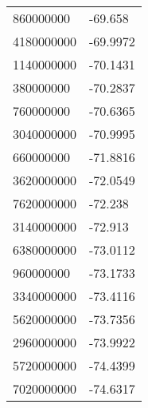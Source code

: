\begin{tabular}{ll}
860000000 & -69.658 \\ 
4180000000 & -69.9972 \\ 
1140000000 & -70.1431 \\ 
380000000 & -70.2837 \\ 
760000000 & -70.6365 \\ 
3040000000 & -70.9995 \\ 
660000000 & -71.8816 \\ 
3620000000 & -72.0549 \\ 
7620000000 & -72.238 \\ 
3140000000 & -72.913 \\ 
6380000000 & -73.0112 \\ 
960000000 & -73.1733 \\ 
3340000000 & -73.4116 \\ 
5620000000 & -73.7356 \\ 
2960000000 & -73.9922 \\ 
5720000000 & -74.4399 \\ 
7020000000 & -74.6317 \\ 
\hline 
\end{tabular}